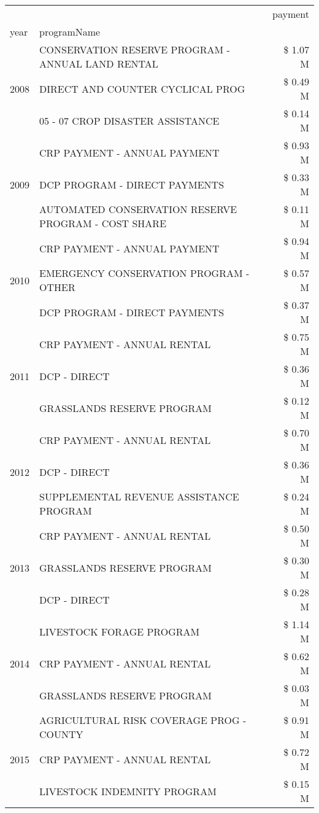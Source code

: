 \begin{tabular}{llr}
\toprule
 &  & payment \\
year & programName &  \\
\midrule
\multirow[t]{3}{*}{2008} & CONSERVATION RESERVE PROGRAM - ANNUAL LAND RENTAL & \$ 1.07 M \\
 & DIRECT AND COUNTER CYCLICAL PROG & \$ 0.49 M \\
 & 05 - 07 CROP DISASTER ASSISTANCE & \$ 0.14 M \\
\cline{1-3}
\multirow[t]{3}{*}{2009} & CRP PAYMENT - ANNUAL PAYMENT & \$ 0.93 M \\
 & DCP PROGRAM - DIRECT PAYMENTS & \$ 0.33 M \\
 & AUTOMATED CONSERVATION RESERVE PROGRAM - COST SHARE & \$ 0.11 M \\
\cline{1-3}
\multirow[t]{3}{*}{2010} & CRP PAYMENT - ANNUAL PAYMENT & \$ 0.94 M \\
 & EMERGENCY CONSERVATION PROGRAM - OTHER & \$ 0.57 M \\
 & DCP PROGRAM - DIRECT PAYMENTS & \$ 0.37 M \\
\cline{1-3}
\multirow[t]{3}{*}{2011} & CRP PAYMENT - ANNUAL RENTAL & \$ 0.75 M \\
 & DCP - DIRECT & \$ 0.36 M \\
 & GRASSLANDS RESERVE PROGRAM & \$ 0.12 M \\
\cline{1-3}
\multirow[t]{3}{*}{2012} & CRP PAYMENT - ANNUAL RENTAL & \$ 0.70 M \\
 & DCP - DIRECT & \$ 0.36 M \\
 & SUPPLEMENTAL REVENUE ASSISTANCE PROGRAM & \$ 0.24 M \\
\cline{1-3}
\multirow[t]{3}{*}{2013} & CRP PAYMENT - ANNUAL RENTAL & \$ 0.50 M \\
 & GRASSLANDS RESERVE PROGRAM & \$ 0.30 M \\
 & DCP - DIRECT & \$ 0.28 M \\
\cline{1-3}
\multirow[t]{3}{*}{2014} & LIVESTOCK FORAGE PROGRAM & \$ 1.14 M \\
 & CRP PAYMENT - ANNUAL RENTAL & \$ 0.62 M \\
 & GRASSLANDS RESERVE PROGRAM & \$ 0.03 M \\
\cline{1-3}
\multirow[t]{3}{*}{2015} & AGRICULTURAL RISK COVERAGE PROG - COUNTY & \$ 0.91 M \\
 & CRP PAYMENT - ANNUAL RENTAL & \$ 0.72 M \\
 & LIVESTOCK INDEMNITY PROGRAM & \$ 0.15 M \\
\cline{1-3}

\end{tabular}
